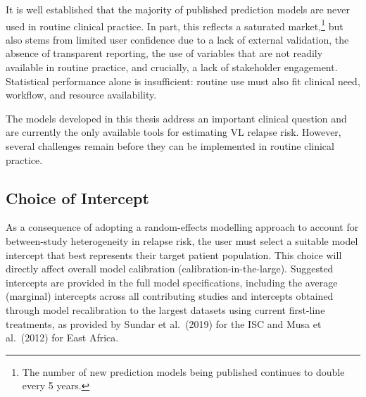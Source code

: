 It is well established that the majority of published prediction models are never used in routine clinical practice\cite{markowetz2024}. In part, this reflects a saturated market,\footnote{The number of new prediction models being published continues to double every 5 years\cite{arshi2025}.} but also stems from limited user confidence due to a lack of external validation, the absence of transparent reporting, the use of variables that are not readily available in routine practice, and crucially, a lack of stakeholder engagement\cite{markowetz2024,moons2015}. Statistical performance alone is insufficient: routine use must also fit clinical need, workflow, and resource availability.


The models developed in this thesis address an important clinical question and are currently the only available tools for estimating VL relapse risk. However, several challenges remain before they can be implemented in routine clinical practice. 

\subsection{Choice of Intercept}

As a consequence of adopting a random-effects modelling approach to account for between-study heterogeneity in relapse risk, the user must select a suitable model intercept that best represents their target patient population. This choice will directly affect overall model calibration (calibration-in-the-large). Suggested intercepts are provided in the full model specifications, including the average (marginal) intercepts across all contributing studies and intercepts obtained through model recalibration to the largest datasets using current first-line treatments, as provided by Sundar et al.\ (2019) for the ISC and Musa et al.\ (2012) for East Africa\cite{sundar2019,musa2012}.

